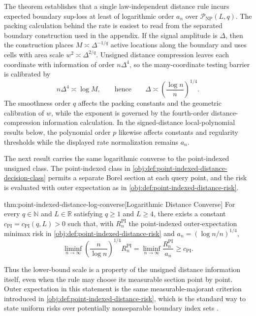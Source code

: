 \documentclass[11pt]{article}
\begin{document}
The theorem establishes that a single law-independent distance rule incurs expected boundary sup-loss at least of logarithmic order \(a_n\) over \(\mathcal P_{\mathrm{NP}}(L,q)\). The packing calculation behind the rate is easiest to read from the separated boundary construction used in the appendix. If the signal amplitude is \(\Delta\), then the construction places \(M\asymp\Delta^{-1/q}\) active locations along the boundary and uses cells with area scale \(w^2\asymp\Delta^{2/q}\). Unsigned distance compression leaves each coordinate with information of order \(n\Delta^4\), so the many-coordinate testing barrier is calibrated by
\[
n\Delta^4\asymp \log M,
\qquad\text{hence}\qquad
\Delta\asymp \left(\frac{\log n}{n}\right)^{1/4}.
\]
The smoothness order \(q\) affects the packing constants and the geometric calibration of \(w\), while the exponent is governed by the fourth-order distance-compression information calculation. In the signed-distance local-polynomial results below, the polynomial order \(p\) likewise affects constants and regularity thresholds while the displayed rate normalization remains \(a_n\).

The next result carries the same logarithmic converse to the point-indexed unsigned class. The point-indexed class in \cref{obj:def:point-indexed-distance-decision-class} permits a separate Borel section at each query point, and the risk is evaluated with outer expectation as in \cref{obj:def:point-indexed-distance-risk}.

\begin{theoremv}{thm:point-indexed-distance-log-converse}[Logarithmic Distance Converse]
For every \(q\in\mathbb N\) and \(L\in\mathbb R\) satisfying \(q\geq 1\) and \(L\geq 4\), there exists a constant \(c_{\mathrm{PI}}=c_{\mathrm{PI}}(q,L)>0\) such that, with \(R_n^{\mathrm{PI}}\) the point-indexed outer-expectation minimax risk in \cref{obj:def:point-indexed-distance-risk} and \(a_n=(\log n/n)^{1/4}\),
\[
\liminf_{n\to\infty}
\left(\frac{n}{\log n}\right)^{1/4} R_n^{\mathrm{PI}}
=
\liminf_{n\to\infty}
\frac{R_n^{\mathrm{PI}}}{a_n}
\geq c_{\mathrm{PI}}.
\]
\end{theoremv}

Thus the lower-bound scale is a property of the unsigned distance information itself, even when the rule may choose its measurable section point by point. Outer expectation in this statement is the same measurable-majorant criterion introduced in \cref{obj:def:point-indexed-distance-risk}, which is the standard way to state uniform risks over potentially nonseparable boundary index sets \citep{VanderVaart1996}.
\end{document}
